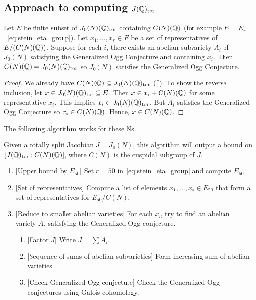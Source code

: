 \documentclass[11pt, proquest]{uwthesis}
\begin{document}
\subsection{Approach to computing $J(\mathbb{Q})_{\mathrm{tor}}$}%
\label{sub:approach_to_computing_j_qq__tor_}

\begin{proposition}
    Let $E$ be finite subset of $J_0(N)(\mathbb{Q})_{\mathrm{tor}}$ containing $C(N)(\mathbb{Q})$ (for
    example $E=E_r$~\eqref{eq:stein_eta_group}). Let $x_1,\ldots,x_r\in E$ be a
    set of representatives of $E/(C(N)(\mathbb{Q}))$. Suppose for each $i$, there
    exists an abelian subvariety $A_i$ of $J_0(N)$ satisfying the Generalized
    Ogg Conjecture and containing $x_i$. Then $C(N)(\mathbb{Q})=J_0(N)(\mathbb{Q})_{\mathrm{tor}}$ so
    $J_0(N)$ satisfies the Generalized Ogg Conjecture.
\end{proposition}
\begin{proof}
    We already have $C(N)(\mathbb{Q})\subseteq J_0(N)(\mathbb{Q})_{\mathrm{tor}}$ (\ref{}). To show the
    reverse inclusion, let $x\in J_0(N)(\mathbb{Q})_{\mathrm{tor}}\subseteq E$. Then $x\in
    x_i+C(N)(\mathbb{Q})$ for some representative $x_i$. This implies $x_i\in
    J_0(N)(\mathbb{Q})_{\mathrm{tor}}$. But $A_i$ satisfies the Generalized Ogg Conjecture so
    $x_i\in C(N)(\mathbb{Q})$. Hence, $x\in C(N)(\mathbb{Q})$.
\end{proof}

The following algorithm works for these Ns. %
\begin{algorithm}
    Given a totally split Jacobian $J=J_0(N)$, this algorithm will output a
    bound on $[J(\mathbb{Q})_{\mathrm{tor}}:C(N)(\mathbb{Q})]$, where $C(N)$ is the cuspidal subgroup
    of $J$.
    \begin{enumerate}
        \item{} [Upper bound by $E_{50}$]
            Set $r=50$ in~\eqref{eq:stein_eta_group} and compute $E_{50}$.
        \item{} [Set of representatives]
            Compute a list of elements $x_1,\ldots,x_s\in E_{50}$ that form a
            set of representatives for $E_{50}/C(N)$.
        \item{} [Reduce to smaller abelian varieties]
            For each $x_i$, try to find an abelian variety $A_i$ satisfying the
            Generalized Ogg conjecture.
            \begin{enumerate}
                \item{} [Factor $J$]
                    Write $J=\sum A_i$.
                \item{} [Sequence of sums of abelian subvarieties]
                    Form increasing sum of abelian varieties
                \item{} [Check Generalized Ogg conjecture]
                    Check the Generalized Ogg conjectures using Galois
                    cohomology.
            \end{enumerate}
    \end{enumerate}
\end{algorithm}
\end{document}
